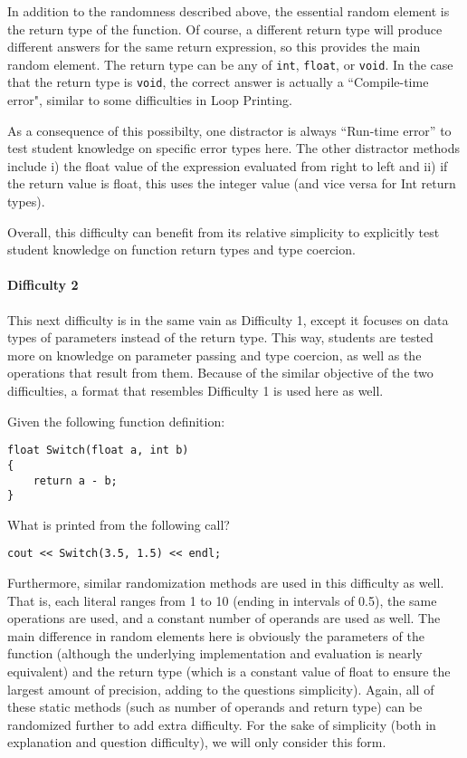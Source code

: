 \documentclass{article}
\begin{document}
In addition to the randomness described above, the essential random element is the return type of the function. Of course, a different return type will produce different answers for the same return expression, so this provides the main random element. The return type can be any of  \texttt{int}, \texttt{float}, or \texttt{void}. In the case that the return type is \texttt{void}, the correct
answer is actually a ``Compile-time error", similar to some difficulties in Loop Printing. 

As a consequence of this possibilty, one distractor is always ``Run-time error'' to test student knowledge on specific error types here. The other distractor methods include i) the float value
of the expression evaluated from right to left and ii) if the return value is float, this uses the integer value (and vice versa for Int return types).

Overall, this difficulty can benefit from its relative simplicity to explicitly test student knowledge on function return types and type coercion.

\paragraph{Difficulty 2} \hfill \par

This next difficulty is in the same vain as Difficulty 1, except it focuses on data types of parameters instead of the return type. This way, students are tested more on knowledge on parameter passing and type coercion, as well as the operations that result from them.
Because of the similar objective of the two difficulties, a format that resembles Difficulty 1 is used here as well.
\hfill \par \hfill \par

\noindent
\begin{VerbCM}
Given the following function definition:
\end{VerbCM}
\begin{lstlisting}
float Switch(float a, int b)
{
    return a - b;
}
\end{lstlisting}
\begin{VerbCM}
What is printed from the following call?
\end{VerbCM}
\begin{lstlisting}
cout << Switch(3.5, 1.5) << endl;
\end{lstlisting}


Furthermore, similar randomization methods are used in this difficulty as well. That is, each literal ranges from 1 to 10 (ending in intervals of 0.5), the same operations are used, and a constant number of operands are used as well. The main difference in random elements here 
is obviously the parameters of the function (although the underlying implementation and evaluation is nearly equivalent) and the return type (which is a constant value of float to ensure the largest amount of precision, adding to the questions simplicity). Again, all of these static methods (such as number of operands and return type) can be randomized further to add extra difficulty. For the sake of simplicity (both in explanation and question difficulty), we will only consider this form.
\end{document}
